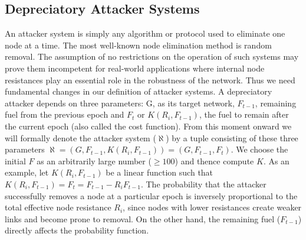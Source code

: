 \documentclass{article}
\begin{document}
	\subsection{Depreciatory Attacker Systems}
	An attacker system is simply any algorithm or protocol used to eliminate one node at a time. The most well-known node elimination method is random removal. The assumption of no restrictions on the operation of such systems may prove them incompetent for real-world applications where internal node resistances play an essential role in the robustness of the network. Thus we need fundamental changes in our definition of attacker systems. A depreciatory attacker depends on three parameters: G, as its target network, $F_{t-1}$, remaining fuel from the previous epoch and $F_t$ or $K(R_{i},F_{t-1})$, the fuel to remain after the current epoch (also called the cost function). From this moment onward we will formally denote the attacker system ($\aleph$) by a tuple consisting of these three parameters 
	$\aleph =(G,F_{t-1},K(R_{i},F_{t-1}))=(G,F_{t-1},F_t)$. We choose the initial $F$ as an arbitrarily large number ($ \geq 100$) and thence compute $K$. As an example, let $K(R_i,F_{t-1})$ be a linear function such that $K(R_i,F_{t-1})= F_{t} = F_{t-1} - R_i F_{t-1}$. 
	The probability that the attacker successfully removes a node at a particular epoch is inversely proportional to the total effective node resistance $R_i$, since nodes with lower resistances create weaker links and become prone to removal. On the other hand, the remaining fuel ($F_{t-1}$) directly affects the probability function.
	
	\pagebreak
	
	
\end{document}
